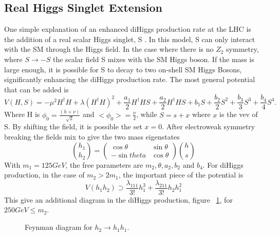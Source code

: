 \subsection{Real Higgs Singlet Extension}
One simple explanation of an enhanced diHiggs production rate at the LHC is the addition of a real scalar Higgs singlet, S \cite{Lewis:2017dme}. In this model, S can only interact with the SM through the Higgs field. In the case where there is no ${Z_{2}}$ symmetry, where ${S\rightarrow -S}$ the scalar field S mixes with the SM Higgs boson. If the mass is large enough, it is possible for S to decay to two on-shell SM Higgs Bosons, significantly enhancing the diHiggs production rate.\newline
\indent The most general potential that can be added is 
\begin{equation}
V(H,S) = -\mu^{2}H^{\dagger}H + \lambda(H^{\dagger}H)^{2} + \frac{a_{1}}{2}H^{\dagger}HS + \frac{a_{2}}{2}H^{\dagger}HS + b_{1}S + \frac{b_{2}}{2}S^{2} + \frac{b_{3}}{3}S^{3} + \frac{b_{4}}{4}S^{4}.
\end{equation}
Where H is ${\phi_{0} = \frac{(h + \nu)}{\sqrt{2}}}$ and ${<\phi_{0}> = \frac{\nu}{2}}$, while ${S = s + x}$ where ${x}$ is the vev of S. By shifting the field, it is possible the set ${x = 0}$. After electroweak symmetry breaking the fields mix to give the two mass eigenstates
\begin{equation}
\binom{h_{1}}{h_{2}} = 
\begin{pmatrix}
\cos{\theta} & \sin{\theta}\\
-\sin{theta} & \cos{\theta}
\end{pmatrix}
\binom{h}{s}
\end{equation}
With ${m_{1} = 125 GeV}$, the free parameters are ${m_{2}, \theta,a_{2},b_{2}}$ and ${b_{4}}$. For diHiggs production, in the case of ${m_{2}>2m_{1}}$, the important piece of the potential is 
\begin{equation}
V(h_{1}h_{2}) \supset \frac{\lambda_{111}}{3!}h_{1}^{3} + \frac{\lambda_{211}}{3!}h_{2}h_{1}^{2}
\end{equation}
This give an additional diagram in the diHiggs production, figure ~\ref{fig:FeyRes}, for ${250 GeV \leq m_{2}}$.
\begin{figure}[h]
\begin{center}
\caption{Feynman diagram for ${h_{2}\rightarrow h_{1}h_{1}}$.}
\label{fig:FeyRes}
\end{center}
\end{figure}

